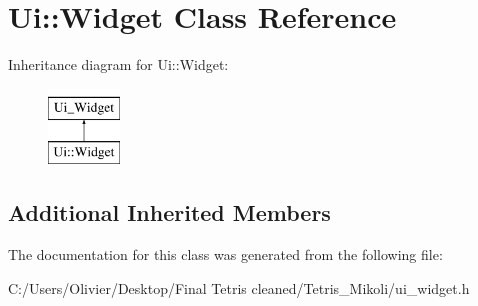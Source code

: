 \section{Ui\+:\+:Widget Class Reference}
\label{class_ui_1_1_widget}
Inheritance diagram for Ui\+:\+:Widget\+:\begin{figure}[H]
\begin{center}
\leavevmode
\includegraphics[height=2.000000cm]{class_ui_1_1_widget}
\end{center}
\end{figure}
\subsection*{Additional Inherited Members}


The documentation for this class was generated from the following file\+:\begin{DoxyCompactItemize}
\item 
C\+:/\+Users/\+Olivier/\+Desktop/\+Final Tetris cleaned/\+Tetris\+\_\+\+Mikoli/ui\+\_\+widget.\+h\end{DoxyCompactItemize}
